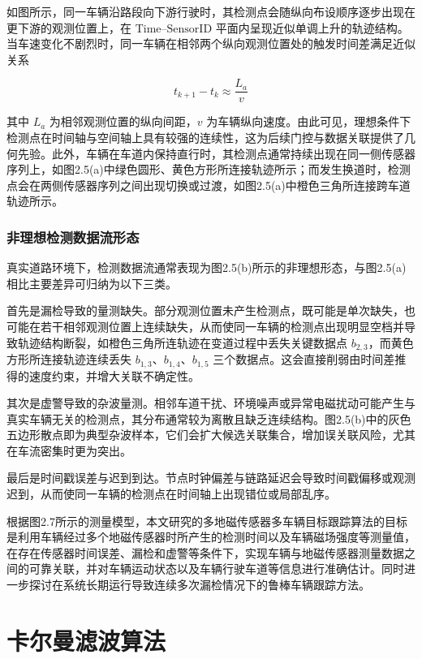 \documentclass{xdupgthesis}
\begin{document}
如图所示，同一车辆沿路段向下游行驶时，其检测点会随纵向布设顺序逐步出现在更下游的观测位置上，在 $\text{Time--SensorID}$ 平面内呈现近似单调上升的轨迹结构。当车速变化不剧烈时，同一车辆在相邻两个纵向观测位置处的触发时间差满足近似关系

\begin{equation}
	t_{k+1}-t_k \approx \frac{L_a}{v}
	\tag{2-7}
\end{equation}

其中 $L_a$ 为相邻观测位置的纵向间距，$v$ 为车辆纵向速度。由此可见，理想条件下检测点在时间轴与空间轴上具有较强的连续性，这为后续门控与数据关联提供了几何先验。此外，车辆在车道内保持直行时，其检测点通常持续出现在同一侧传感器序列上，如图2.5(a)中绿色圆形、黄色方形所连接轨迹所示；而发生换道时，检测点会在两侧传感器序列之间出现切换或过渡，如图2.5(a)中橙色三角所连接跨车道轨迹所示。

\subsubsection{非理想检测数据流形态}


真实道路环境下，检测数据流通常表现为图2.5(b)所示的非理想形态，与图2.5(a)相比主要差异可归纳为以下三类。

首先是漏检导致的量测缺失。部分观测位置未产生检测点，既可能是单次缺失，也可能在若干相邻观测位置上连续缺失，从而使同一车辆的检测点出现明显空档并导致轨迹结构断裂，如橙色三角所连轨迹在变道过程中丢失关键数据点 $b_{2,3}$，而黄色方形所连接轨迹连续丢失 $b_{1,3}$、$b_{1,4}$、$b_{1,5}$ 三个数据点。这会直接削弱由时间差推得的速度约束，并增大关联不确定性。

其次是虚警导致的杂波量测。相邻车道干扰、环境噪声或异常电磁扰动可能产生与真实车辆无关的检测点，其分布通常较为离散且缺乏连续结构。图2.5(b)中的灰色五边形散点即为典型杂波样本，它们会扩大候选关联集合，增加误关联风险，尤其在车流密集时更为突出。

最后是时间戳误差与迟到到达。节点时钟偏差与链路延迟会导致时间戳偏移或观测迟到，从而使同一车辆的检测点在时间轴上出现错位或局部乱序。

根据图2.7所示的测量模型，本文研究的多地磁传感器多车辆目标跟踪算法的目标是利用车辆经过多个地磁传感器时所产生的检测时间以及车辆磁场强度等测量值，在存在传感器时间误差、漏检和虚警等条件下，实现车辆与地磁传感器测量数据之间的可靠关联，并对车辆运动状态以及车辆行驶车道等信息进行准确估计。同时进一步探讨在系统长期运行导致连续多次漏检情况下的鲁棒车辆跟踪方法。


\section{卡尔曼滤波算法}
\end{document}
